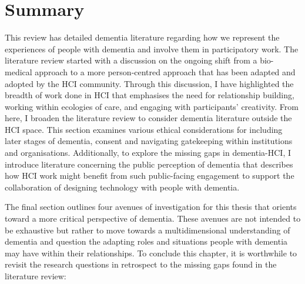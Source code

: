 \section{Summary}
\label{BL:summary}
This review has detailed dementia literature regarding how we represent the experiences of people with dementia and involve them in participatory work. The literature review started with a discussion on the ongoing shift from a bio-medical approach to a more person-centred approach that has been adapted and adopted by the HCI community. Through this discussion, I have highlighted the breadth of work done in HCI that emphasises the need for relationship building, working within ecologies of care, and engaging with participants' creativity. From here, I broaden the literature review to consider dementia literature outside the HCI space. This section examines various ethical considerations for including later stages of dementia, consent and navigating gatekeeping within institutions and organisations. Additionally, to explore the missing gaps in dementia-HCI, I introduce literature concerning the public perception of dementia that describes how HCI work might benefit from such public-facing engagement to support the collaboration of designing technology with people with dementia.

The final section outlines four avenues of investigation for this thesis that orients toward a more critical perspective of dementia. These avenues are not intended to be exhaustive but rather to move towards a multidimensional understanding of dementia and question the adapting roles and situations people with dementia may have within their relationships. To conclude this chapter, it is worthwhile to revisit the research questions in retrospect to the missing gaps found in the literature review:


